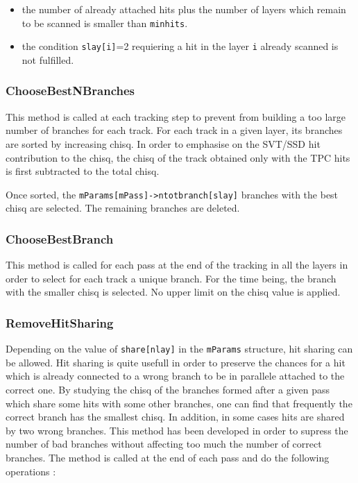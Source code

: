 \documentclass[twoside]{article}
\begin{document}
\begin{itemize}
\item the number of already attached hits plus the number of layers which remain to be scanned is smaller than \verb+minhits+.
\item the condition \verb+slay[i]+=2 requiering a hit in the layer \verb+i+ already scanned is not fulfilled.
\end{itemize}

\subsubsection{ChooseBestNBranches}
\label{sec:ChooseBestNBranchesq}

This method is called at each tracking step to prevent from building a
too large number of branches for each track. For each track in a given
layer, its branches are sorted by increasing chisq. In order to
emphasise on the SVT/SSD hit contribution to the chisq, the chisq of
the track obtained only with the TPC hits is first subtracted to the
total chisq.

Once sorted, the \verb+mParams[mPass]->ntotbranch[slay]+ branches with
the best chisq are selected. The remaining branches are deleted.

\subsubsection{ChooseBestBranch}
\label{sec:ChooseBestBranchq}

This method is called for each pass at the end of the tracking in all
the layers in order to select for each track a unique branch. For the
time being, the branch with the smaller chisq is selected. No upper
limit on the chisq value is applied. 


\subsubsection{RemoveHitSharing}
\label{sec:RemoveHitSharingq}

Depending on the value of \verb+share[nlay]+ in the \verb+mParams+
structure, hit sharing can be allowed. Hit sharing is quite usefull in
order to preserve the chances for a hit which is already connected to
a wrong branch to be in parallele attached to the correct one. By
studying the chisq of the branches formed after a given pass which
share some hits with some other branches, one can find that frequently
the correct branch has the smallest chisq. In addition, in some cases
hits are shared by two wrong branches. This method has been developed
in order to supress the number of bad branches without affecting too
much the number of correct branches. The method is called at the end
of each pass and do the following operations :
\end{document}
